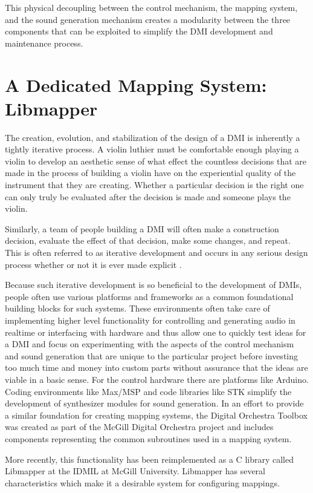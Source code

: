This physical decoupling between the control mechanism, the mapping system, and the sound generation mechanism creates a modularity between the three components that can be exploited to simplify the DMI development and maintenance process.

\section{A Dedicated Mapping System: Libmapper}

The creation, evolution, and stabilization of the design of a DMI is inherently a tightly iterative process. A violin luthier must be comfortable enough playing a violin to develop an aesthetic sense of what effect the countless decisions that are made in the process of building a violin have on the experiential quality of the instrument that they are creating. Whether a particular decision is the right one can only truly be evaluated after the decision is made and someone plays the violin. 

Similarly, a team of people building a DMI will often make a construction decision, evaluate the effect of that decision, make some changes, and repeat. This is often referred to as iterative development and occurs in any serious design process whether or not it is ever made explicit \cite{iterative2003}. 

Because such iterative development is so beneficial to the development of DMIs, people often use various platforms and frameworks as a common foundational building blocks for such systems. These environments often take care of implementing higher level functionality for controlling and generating audio in realtime or interfacing with hardware and thus allow one to quickly test ideas for a DMI and focus on experimenting with the aspects of the control mechanism and sound generation that are unique to the particular project before investing too much time and money into custom parts without assurance that the ideas are viable in a basic sense. For the control hardware there are platforms like Arduino. Coding environments like Max/MSP and code libraries like STK simplify the development of synthesizer modules for sound generation. In an effort to provide a similar foundation for creating mapping systems, the Digital Orchestra Toolbox was created as part of the McGill Digital Orchestra project and includes components representing the common subroutines used in a mapping system. 

More recently, this functionality has been reimplemented as a C library called Libmapper at the IDMIL at McGill University. Libmapper has several characteristics which make it a desirable system for configuring mappings. 

